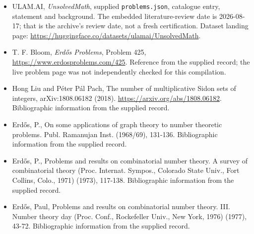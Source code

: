 \documentclass[11pt,a4paper]{article}
\begin{document}
{\small

\begin{itemize}

\item[\hypertarget{source:statement:1}{S1}] ULAM.AI, \emph{UnsolvedMath}, supplied \texttt{problems.json}, catalogue entry, statement and background. The embedded literature-review date is 2026-08-17; that is the archive’s review date, not a fresh certification. Dataset landing page: \url{https://huggingface.co/datasets/ulamai/UnsolvedMath}.

\item[\hypertarget{source:statement:2}{S2}] T. F. Bloom, \emph{Erdős Problems}, Problem 425, \url{https://www.erdosproblems.com/425}. Reference from the supplied record; the live problem page was not independently checked for this compilation.

\item[\hypertarget{source:statement:3}{S3}] Hong Liu and Péter Pál Pach, The number of multiplicative Sidon sets of integers, arXiv:1808.06182 (2018). \url{https://arxiv.org/abs/1808.06182}. Bibliographic information from the supplied record.

\item[\hypertarget{source:statement:4}{S4}] Erd\H{o}s, P., On some applications of graph theory to number theoretic problems. Publ. Ramanujan Inst. (1968/69), 131-136. Bibliographic information from the supplied record.

\item[\hypertarget{source:statement:5}{S5}] Erd\H{o}s, P., Problems and results on combinatorial number theory. A survey of combinatorial theory (Proc. Internat. Sympos., Colorado State Univ., Fort Collins, Colo., 1971) (1973), 117-138. Bibliographic information from the supplied record.

\item[\hypertarget{source:statement:6}{S6}] Erd\H{o}s, Paul, Problems and results on combinatorial number theory. III. Number theory day (Proc. Conf., Rockefeller Univ., New York, 1976) (1977), 43-72. Bibliographic information from the supplied record.

\end{itemize}

}

\label{end:statement}
\end{document}
